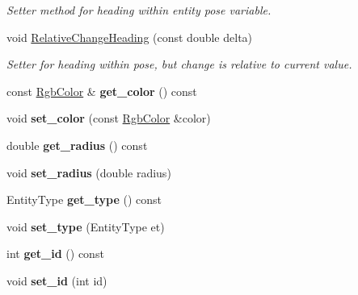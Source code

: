 \begin{DoxyCompactItemize}
\begin{DoxyCompactList}\small\item\em Setter method for heading within entity pose variable. \end{DoxyCompactList}\item 
void \hyperlink{class_arena_entity_a4c4bd7f5ffb778979303c33cb3bc9986}{Relative\+Change\+Heading} (const double delta)
\begin{DoxyCompactList}\small\item\em Setter for heading within pose, but change is relative to current value. \end{DoxyCompactList}\item 
const \hyperlink{struct_rgb_color}{Rgb\+Color} \& {\bfseries get\+\_\+color} () const \hypertarget{class_arena_entity_a9ba62519f6c6294373fdc8488713b4e0}{}\label{class_arena_entity_a9ba62519f6c6294373fdc8488713b4e0}

\item 
void {\bfseries set\+\_\+color} (const \hyperlink{struct_rgb_color}{Rgb\+Color} \&color)\hypertarget{class_arena_entity_a1ac33beda7462ac5c7f4f71a70d3fb10}{}\label{class_arena_entity_a1ac33beda7462ac5c7f4f71a70d3fb10}

\item 
double {\bfseries get\+\_\+radius} () const \hypertarget{class_arena_entity_a5a2b834ad654f42785c3073c25a0fea8}{}\label{class_arena_entity_a5a2b834ad654f42785c3073c25a0fea8}

\item 
void {\bfseries set\+\_\+radius} (double radius)\hypertarget{class_arena_entity_a2b0c2512fe53d143442da5e357f71505}{}\label{class_arena_entity_a2b0c2512fe53d143442da5e357f71505}

\item 
Entity\+Type {\bfseries get\+\_\+type} () const \hypertarget{class_arena_entity_a69a818480868f9b0417e6f9ed20dfc96}{}\label{class_arena_entity_a69a818480868f9b0417e6f9ed20dfc96}

\item 
void {\bfseries set\+\_\+type} (Entity\+Type et)\hypertarget{class_arena_entity_aa65c584906d4c22f61488fab98c3392c}{}\label{class_arena_entity_aa65c584906d4c22f61488fab98c3392c}

\item 
int {\bfseries get\+\_\+id} () const \hypertarget{class_arena_entity_aee353e402d9b8a7372fae30b7a0ce4a0}{}\label{class_arena_entity_aee353e402d9b8a7372fae30b7a0ce4a0}

\item 
void {\bfseries set\+\_\+id} (int id)\hypertarget{class_arena_entity_a67f4c0467d32eec76ee6ed033ff9ed2f}{}\label{class_arena_entity_a67f4c0467d32eec76ee6ed033ff9ed2f}


\end{DoxyCompactItemize}
